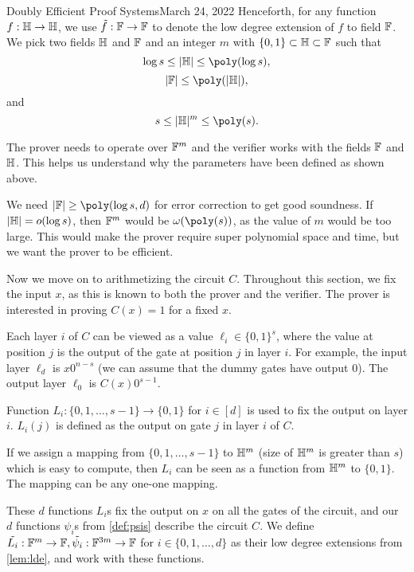 \begin{lecture}{9}{Doubly Efficient Proof Systems}{March 24, 2022}
Henceforth, for any function $f: \mathbb{H} \to \mathbb{H}$, we use $\tilde{f}:\mathbb{F} \to \mathbb{F}$ to
denote the low degree extension of $f$ to field $\mathbb{F}$. We pick two fields $\mathbb{H}$
and $\mathbb{F}$ and an integer $m$ with $\{0,1\} \subset \mathbb{H} \subset \mathbb{F}$ such that
\begin{equation}
  \log s \leq |\fH| \leq \poly(\log s),
\end{equation}
\begin{equation}
  |\F| \leq \poly(|\fH|),
\end{equation}
and
\begin{equation}
  s \leq |\fH|^m \leq \poly(s).
\end{equation}

The prover needs to operate over $\mathbb{F}^m$ and the verifier works with the fields
$\mathbb{F}$ and $\mathbb{H}$. This helps us understand why the parameters have been defined
as shown above.

We need $|\F| \geq \poly(\log s, d)$ for error correction to get good
soundness. If $|\mathbb{H}| = o(\log s)$, then $\mathbb{F}^m$ would be $\omega(\poly(s))$, as
the value of $m$ would be too large. This would make the prover require super
polynomial space and time, but we want the prover to be efficient.

Now we move on to arithmetizing the circuit $C$. Throughout this section, we
fix the input $x$, as this is known to both the prover and the verifier. The
prover is interested in proving $C(x)=1$ for a fixed $x$.

Each layer $i$ of $C$ can be viewed as a value $\ell_i \in \{0,1\}^{s}$, where
the value at position $j$ is the output of the gate at position $j$ in layer
$i$. For example, the input layer $\ell_d$ is $x0^{n-s}$ (we can assume that
the dummy gates have output 0). The output layer $\ell_0$ is $C(x)0^{s-1}$.

Function $L_i:\{0,1, \ldots, s-1\} \rightarrow \{0,1\}$ for $i \in [d]$ is used
to fix the output on layer $i$. $L_i(j)$ is defined as the output on gate $j$
in layer $i$ of $C$.

If we assign a mapping from $\{0,1, \ldots, s-1\}$ to $\mathbb{H}^m$ (size of $\mathbb{H}^m$
is greater than $s$) which is easy to compute, then $L_i$ can be seen as a
function from $\mathbb{H}^m$ to $\{0,1\}$. The mapping can be any one-one mapping.

These $d$ functions $L_i$s fix the output on $x$ on all the gates of the
circuit, and our $d$ functions $\psi_i$s from \cref{def:psis} describe the
circuit $C$. We define $\tilde{L_i}: \mathbb{F}^m \rightarrow \mathbb{F}, \tilde{\psi_i}:
\mathbb{F}^{3m} \rightarrow \mathbb{F}$ for $i\in \{0,1,\ldots, d\}$ as their low degree
extensions from \cref{lem:lde}, and work with these functions.


\end{lecture}
